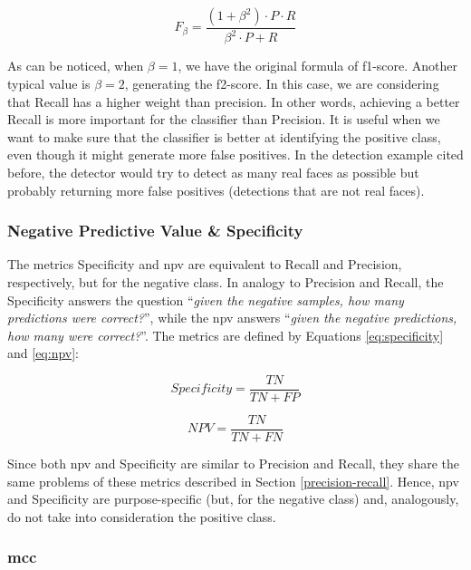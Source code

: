 \begin{equation}
\label{eq:f-beta}
F_\beta = \frac{(1 + \beta^2) \cdot P \cdot R}{\beta^2 \cdot P + R}
\end{equation}

As can be noticed, when $\beta=1$, we have the original formula of f1-score. Another typical value is $\beta=2$, generating the f2-score. In this case, we are considering that Recall has a higher weight than precision. In other words, achieving a better Recall is more important for the classifier than Precision. It is useful when we want to make sure that the classifier is better at identifying the positive class, even though it might generate more false positives. In the detection example cited before, the detector would try to detect as many real faces as possible but probably returning more false positives (detections that are not real faces).

\subsubsection{Negative Predictive Value \& Specificity}

The metrics Specificity and \acf{npv} are equivalent to Recall and Precision, respectively, but for the negative class. In analogy to Precision and Recall, the Specificity answers the question ``\textit{given the negative samples, how many predictions were correct?}'', while the \acs{npv} answers ``\textit{given the negative predictions, how many were correct?}''. The metrics are defined by Equations \ref{eq:specificity} and \ref{eq:npv}:

\begin{equation}
\label{eq:specificity}
Specificity = \frac{TN}{TN + FP}
\end{equation}

\begin{equation}
\label{eq:npv}
NPV = \frac{TN}{TN + FN}
\end{equation}

Since both \acs{npv} and Specificity are similar to Precision and Recall, they share the same problems of these metrics described in Section \ref{precision-recall}. Hence, \acs{npv} and Specificity are purpose-specific (but, for the negative class) and, analogously, do not take into consideration the positive class.

\subsubsection{\acl{mcc}} \label{sec:mcc}

